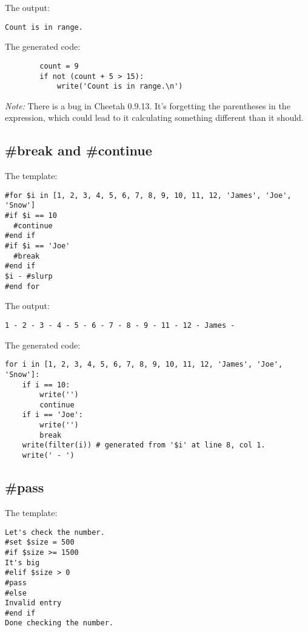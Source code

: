 The output:
\begin{verbatim}
Count is in range.
\end{verbatim}

The generated code:
\begin{verbatim}
        count = 9
        if not (count + 5 > 15):
            write('Count is in range.\n')
\end{verbatim}

{\em Note:} There is a bug in Cheetah 0.9.13.  It's forgetting the
parentheses in the  expression, which could lead to it calculating
something different than it should.


\subsection{\#break and \#continue}
\label{flowControl.break}

The template:
\begin{verbatim}
#for $i in [1, 2, 3, 4, 5, 6, 7, 8, 9, 10, 11, 12, 'James', 'Joe', 'Snow']
#if $i == 10
  #continue
#end if
#if $i == 'Joe'
  #break
#end if
$i - #slurp
#end for
\end{verbatim}

The output:
\begin{verbatim}
1 - 2 - 3 - 4 - 5 - 6 - 7 - 8 - 9 - 11 - 12 - James - 
\end{verbatim}

The generated code:
\begin{verbatim}
for i in [1, 2, 3, 4, 5, 6, 7, 8, 9, 10, 11, 12, 'James', 'Joe', 'Snow']:
    if i == 10:
        write('')
        continue
    if i == 'Joe':
        write('')
        break
    write(filter(i)) # generated from '$i' at line 8, col 1.
    write(' - ')
\end{verbatim}


\subsection{\#pass}
\label{flowControl.pass}

The template:
\begin{verbatim}
Let's check the number.
#set $size = 500
#if $size >= 1500
It's big
#elif $size > 0 
#pass
#else
Invalid entry
#end if
Done checking the number.
\end{verbatim}

